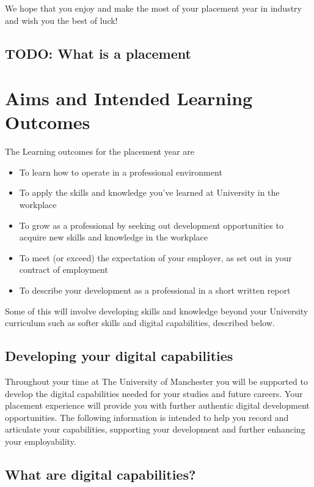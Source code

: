 \documentclass[
]{book}
\providecommand{\tightlist}{%
  \setlength{\itemsep}{0pt}\setlength{\parskip}{0pt}}
\begin{document}
We hope that you enjoy and make the most of your placement year in industry and wish you the best of luck!

\section{TODO: What is a placement}\label{todo-what-is-a-placement}

\chapter{Aims and Intended Learning Outcomes}\label{aims-and-intended-learning-outcomes}

The Learning outcomes for the placement year are

\begin{itemize}
\tightlist
\item
  To learn how to operate in a professional environment
\item
  To apply the skills and knowledge you've learned at University in the workplace
\item
  To grow as a professional by seeking out development opportunities to acquire new skills and knowledge in the workplace
\item
  To meet (or exceed) the expectation of your employer, as set out in your contract of employment
\item
  To describe your development as a professional in a short written report
\end{itemize}

Some of this will involve developing skills and knowledge beyond your University curriculum such as softer skills and digital capabilities, described below.

\section{Developing your digital capabilities}\label{developing-your-digital-capabilities}

Throughout your time at The University of Manchester you will be supported to develop the digital capabilities needed for your studies and future careers. Your placement experience will provide you with further authentic digital development opportunities. The following information is intended to help
you record and articulate your capabilities, supporting your development and further enhancing your employability.

\section{What are digital capabilities?}\label{what-are-digital-capabilities}
\end{document}
